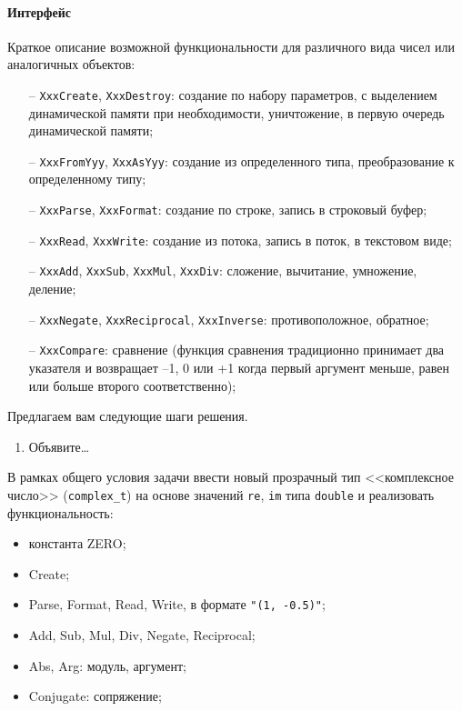 \paragraph{Интерфейс}
Краткое описание возможной функциональности для различного вида чисел или
аналогичных объектов:
%
\begin{itemize}
%
\item[--] \texttt{XxxCreate}, \texttt{XxxDestroy}: создание по набору параметров, с выделением динамической памяти при необходимости, уничтожение, в первую очередь динамической памяти;
%
\item[--] \texttt{XxxFromYyy}, \texttt{XxxAsYyy}: создание из определенного типа, преобразование к определенному типу;
%
\item[--] \texttt{XxxParse}, \texttt{XxxFormat}: создание по строке, запись в строковый буфер;
%
\item[--] \texttt{XxxRead}, \texttt{XxxWrite}: создание из потока, запись в поток, в текстовом виде;
%
\item[--] \texttt{XxxAdd}, \texttt{XxxSub}, \texttt{XxxMul}, \texttt{XxxDiv}: сложение, вычитание, умножение, деление;
%
\item[--] \texttt{XxxNegate}, \texttt{XxxReciprocal}, \texttt{XxxInverse}: противоположное, обратное;
%
\item[--] \texttt{XxxCompare}: сравнение (функция сравнения традиционно принимает два указателя и возвращает –1, 0 или +1 когда первый аргумент меньше, равен или больше второго соответственно);
%
\end{itemize}


\zzsectionPLAN


Предлагаем вам следующие шаги решения.

\begin{enumerate}
\item Объявите\dots
%
\end{enumerate}



\zzsectionVARIATIONS


\begin{zztask}
В рамках общего условия задачи ввести новый прозрачный тип <<комплексное число>>
(\texttt{complex\_t}) на основе значений \texttt{re}, \texttt{im} типа
\texttt{double} и реализовать функциональность:
%
\begin{itemize}
\item константа ZERO;
\item Create;
\item Parse, Format, Read, Write, в формате \verb|"(1, -0.5)"|;
\item Add, Sub, Mul, Div, Negate, Reciprocal;
\item Abs, Arg: модуль, аргумент;
\item Conjugate: сопряжение;
\end{itemize}
\end{zztask}


